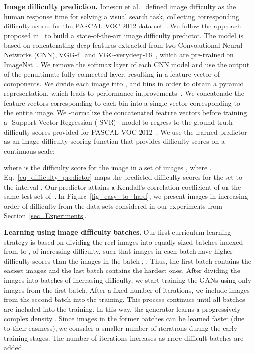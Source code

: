 \documentclass[10pt,twocolumn,letterpaper]{article}
\begin{document}
\noindent
{\bf Image difficulty prediction.}
Ionescu et al.~\cite{Ionescu-CVPR-2016} defined  image difficulty as the human response time for solving a visual search task, collecting corresponding difficulty scores for the PASCAL VOC 2012 data set~\cite{Pascal-VOC-2012}. We follow the approach proposed in~\cite{Ionescu-CVPR-2016} to build a state-of-the-art image difficulty predictor. The model is based on concatenating deep features extracted from two Convolutional Neural Networks (CNN), VGG-f~\cite{Chatfield-BMVC-14} and VGG-verydeep-16~\cite{Simonyan-ICLR-14}, which are pre-trained on ImageNet~\cite{Russakovsky2015}. We remove the softmax layer of each CNN model and use the output of the penultimate fully-connected layer, resulting in a feature vector of  components. We divide each image into ,  and  bins in order to obtain a pyramid representation, which leads to performance improvements~\cite{Ionescu-CVPR-2016}. We concatenate the feature vectors corresponding to each bin into a single vector corresponding to the entire image. We -normalize the concatenated feature vectors before training a -Support Vector Regression (-SVR)~\cite{Chang-NC-2002} model to regress to the ground-truth difficulty scores provided for PASCAL VOC 2012~\cite{Pascal-VOC-2012}. We use the learned predictor  as an image difficulty scoring function that provides difficulty scores on a continuous scale:

where  is the difficulty score for the image  in a set of images , where . Eq.~\eqref{eq_difficulty_predictor} maps the predicted difficulty scores for the set  to the interval . Our predictor attains a Kendall's  correlation coefficient of  on the same test set of~\cite{Ionescu-CVPR-2016}. In Figure~\ref{fig_easy_to_hard}, we present images in increasing order of difficulty from the data sets considered in our experiments from Section~\ref{sec_Experiments}.

\noindent
{\bf Learning using image difficulty batches.}
Our first curriculum learning strategy is based on dividing the real images into  equally-sized batches indexed from  to , of increasing difficulty, such that images in each batch  have higher difficulty scores than the images in the batch , . Thus, the first batch contains the easiest images and the last batch contains the hardest ones. After dividing the images into batches of increasing difficulty, we start training the GANs using only images from the first batch. After a fixed number of iterations, we include images from the second batch into the training. This process continues until all  batches are included into the training. In this way, the generator learns a progressively complex density . Since images in the former batches can be learned faster (due to their easiness), we consider a smaller number of iterations during the early training stages. The number of iterations increases as more difficult batches are added.
\end{document}
